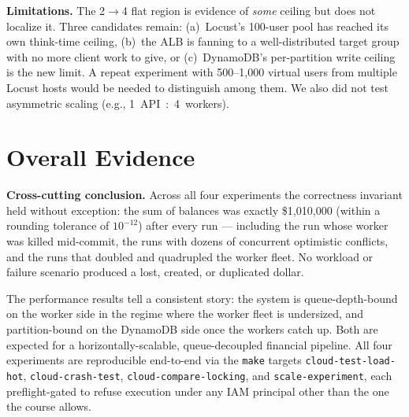 \documentclass[10pt,a4paper]{article}
\begin{document}
\begin{limitbox}
\textbf{Limitations.} The 2$\rightarrow$4 flat region is evidence of \textit{some} ceiling but does not localize it. Three candidates remain: (a)~Locust's 100-user pool has reached its own think-time ceiling, (b)~the ALB is fanning to a well-distributed target group with no more client work to give, or (c)~DynamoDB's per-partition write ceiling is the new limit. A repeat experiment with 500--1{,}000 virtual users from multiple Locust hosts would be needed to distinguish among them. We also did not test asymmetric scaling (e.g., 1~API~:~4~workers).
\end{limitbox}

\section*{Overall Evidence}

\begin{systembox}
\textbf{Cross-cutting conclusion.} Across all four experiments the correctness invariant held without exception: the sum of balances was exactly \$1{,}010{,}000 (within a rounding tolerance of $10^{-12}$) after every run --- including the run whose worker was killed mid-commit, the runs with dozens of concurrent optimistic conflicts, and the runs that doubled and quadrupled the worker fleet. No workload or failure scenario produced a lost, created, or duplicated dollar.

\medskip
The performance results tell a consistent story: the system is queue-depth-bound on the worker side in the regime where the worker fleet is undersized, and partition-bound on the DynamoDB side once the workers catch up. Both are expected for a horizontally-scalable, queue-decoupled financial pipeline. All four experiments are reproducible end-to-end via the \texttt{make} targets \texttt{cloud-test-load-hot}, \texttt{cloud-crash-test}, \texttt{cloud-compare-locking}, and \texttt{scale-experiment}, each preflight-gated to refuse execution under any IAM principal other than the one the course allows.
\end{systembox}
\end{document}
